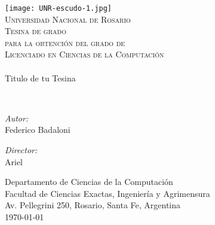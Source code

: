 {%
\thispagestyle{empty}
\begin{center}
    \texttt{[image: UNR-escudo-1.jpg]}
    \\[0.5cm]
    \textsc{\LARGE Universidad Nacional de Rosario}\\[1.5cm]

    \textsc{{\Large Tesina de grado} \\ para la obtenci\'on del grado de \\
     Licenciado en Ciencias de la Computaci\'on}\\[0.5cm]
    \HRule \\[0.4cm] %
        {\huge Titulo de tu Tesina \\[0.4cm]}

    \HRule \\[0.4cm] %
    \noindent
    \begin{minipage}{0.4\textwidth}
        \begin{flushleft} \large
            \emph{Autor:}\\
            Federico Badaloni
        \end{flushleft}
        \end{minipage}%
        \begin{minipage}{0.4\textwidth}
        \begin{flushright} \large
            \emph{Director:} \\
            Ariel \\
        \end{flushright}
    \end{minipage}

\vfill

Departamento de Ciencias de la Computaci\'on\\
Facultad de Ciencias Exactas, Ingenier\'ia y Agrimensura\\
Av. Pellegrini 250, Rosario, Santa Fe, Argentina\\[0.4cm]
{\large \today}

\end{center}
\clearpage
}